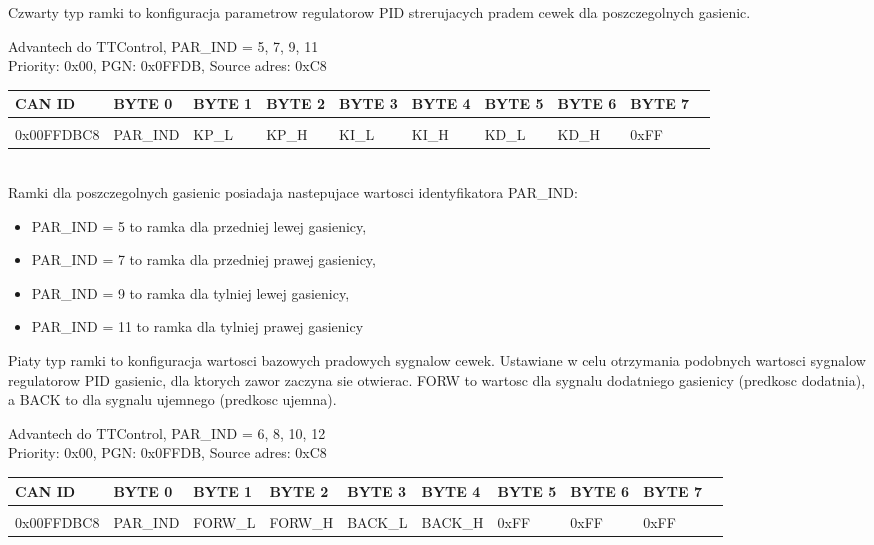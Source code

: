 \documentclass{article}
\begin{document}
Czwarty typ ramki to konfiguracja parametrow regulatorow PID strerujacych pradem cewek dla poszczegolnych gasienic.

Advantech do TTControl, PAR\_IND  = 5, 7, 9, 11\\
Priority: 0x00, PGN: 0x0FFDB, Source adres: 0xC8 \\
\begin{left}
\begin{tabular}{ |p{2cm}|p{1.35cm}|p{1.2cm}|p{1.50cm}|p{1.50cm}|p{1.35cm}|p{1.4cm}|p{1.4cm}|p{1.35cm}|p{1.35cm}|} 
 \hline
 CAN ID & BYTE 0 & BYTE 1 & BYTE 2 & BYTE 3 & BYTE 4 & BYTE 5 & BYTE 6 & BYTE 7 \\ \hline
 & & & & & & & &\\
0x00FFDBC8 & PAR\_IND & KP\_L & KP\_H & KI\_L & KI\_H & KD\_L & KD\_H & 0xFF \\
 \hline
\end{tabular}
\end{left}\\

Ramki dla poszczegolnych gasienic posiadaja nastepujace wartosci identyfikatora PAR\_IND: 
\begin{itemize}
    \item PAR\_IND  = 5 to ramka dla przedniej lewej gasienicy,
    \item PAR\_IND  = 7 to ramka dla przedniej prawej gasienicy,
    \item PAR\_IND  = 9 to ramka dla tylniej lewej gasienicy,
    \item PAR\_IND  = 11 to ramka dla tylniej prawej gasienicy
\end{itemize}

Piaty typ ramki to konfiguracja wartosci bazowych pradowych sygnalow cewek. Ustawiane w celu otrzymania podobnych wartosci sygnalow regulatorow PID gasienic, dla ktorych zawor zaczyna sie otwierac. FORW to wartosc dla sygnalu dodatniego gasienicy (predkosc dodatnia), a BACK to dla sygnalu ujemnego (predkosc ujemna).

Advantech do TTControl, PAR\_IND  = 6, 8, 10, 12\\
Priority: 0x00, PGN: 0x0FFDB, Source adres: 0xC8 \\
\begin{left}
\begin{tabular}{ |p{2cm}|p{1.35cm}|p{1.5cm}|p{1.50cm}|p{1.50cm}|p{1.35cm}|p{1.4cm}|p{1.4cm}|p{1.35cm}|p{1.35cm}|} 
 \hline
 CAN ID & BYTE 0 & BYTE 1 & BYTE 2 & BYTE 3 & BYTE 4 & BYTE 5 & BYTE 6 & BYTE 7 \\ \hline
 & & & & & & & &\\
0x00FFDBC8 & PAR\_IND & FORW\_L & FORW\_H & BACK\_L & BACK\_H & 0xFF & 0xFF & 0xFF \\
 \hline
\end{tabular}
\end{left}\\
\end{document}
